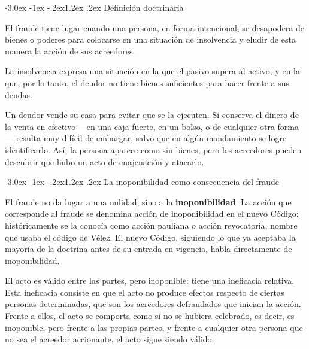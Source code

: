 \documentclass[12pt,oneside]{book}
\makeatletter
\renewcommand\section{\@startsection{section}{1}{\z@}%
  {-3.0ex \@plus -1ex \@minus -.2ex}{1.2ex \@plus .2ex}%
  {\normalfont\large\bfseries\color{acento}}}
\makeatother
\begin{document}
\section{Definición doctrinaria}

\begin{definicion}[{Fraude}]
El fraude tiene lugar cuando una persona, en forma intencional, se desapodera de bienes o poderes para colocarse en una situación de insolvencia y eludir de esta manera la acción de sus acreedores.
\end{definicion}

La insolvencia expresa una situación en la que el pasivo supera al activo, y en la que, por lo tanto, el deudor no tiene bienes suficientes para hacer frente a sus deudas.

\begin{ejemplo}
Un deudor vende su casa para evitar que se la ejecuten. Si conserva el dinero de la venta en efectivo ---en una caja fuerte, en un bolso, o de cualquier otra forma--- resulta muy difícil de embargar, salvo que en algún mandamiento se logre identificarlo. Así, la persona aparece como sin bienes, pero los acreedores pueden descubrir que hubo un acto de enajenación y atacarlo.
\end{ejemplo}

\section{La inoponibilidad como consecuencia del fraude}

El fraude no da lugar a una nulidad, sino a la \textbf{inoponibilidad}. La acción que corresponde al fraude se denomina acción de inoponibilidad en el nuevo Código; históricamente se la conocía como acción pauliana o acción revocatoria, nombre que usaba el código de Vélez. El nuevo Código, siguiendo lo que ya aceptaba la mayoría de la doctrina antes de su entrada en vigencia, habla directamente de inoponibilidad.

El acto es válido entre las partes, pero inoponible: tiene una ineficacia relativa. Esta ineficacia consiste en que el acto no produce efectos respecto de ciertas personas determinadas, que son los acreedores defraudados que inician la acción. Frente a ellos, el acto se comporta como si no se hubiera celebrado, es decir, es inoponible; pero frente a las propias partes, y frente a cualquier otra persona que no sea el acreedor accionante, el acto sigue siendo válido.
\end{document}
